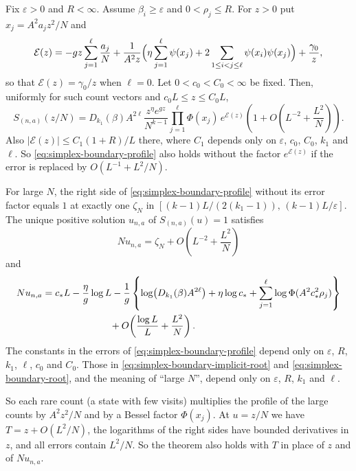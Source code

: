 \begin{theorem}
\label{thm:simplex-boundary-crossover}
Fix $\varepsilon>0$ and $R<\infty$. Assume $\beta_i\ge\varepsilon$ and
$0<\rho_j\le R$. For $z>0$ put $x_j=A^2a_jz^2/N$ and
\[
\mathcal E(z)=-gz\sum_{j=1}^\ell\frac{a_j}{N}
+\frac{1}{A^2z}\Bigl(\eta\sum_{j=1}^\ell\psi(x_j)
+2\sum_{1\le i<j\le\ell}\psi(x_i)\psi(x_j)\Bigr)+\frac{\gamma_0}{z},
\]
so that $\mathcal E(z)=\gamma_0/z$ when $\ell=0$. Let $0<c_0<C_0<\infty$ be
fixed. Then, uniformly for such count vectors and $c_0L\le z\le C_0L$,
\begin{equation}\label{eq:simplex-boundary-profile}
S_{(n,a)}(z/N)
=D_{k_1}(\beta)A^{2\ell}\frac{z^\eta e^{gz}}{N^{k-1}}
\prod_{j=1}^\ell\Phi(x_j)\,e^{\mathcal E(z)}
\left(1+O\!\left(L^{-2}+\frac{L^2}{N}\right)\right).
\end{equation}
Also $|\mathcal E(z)|\le C_1(1+R)/L$ there, where $C_1$ depends only on
$\varepsilon$, $c_0$, $C_0$, $k_1$ and $\ell$. So
\eqref{eq:simplex-boundary-profile} also holds without the factor
$e^{\mathcal E(z)}$ if the error is replaced by $O(L^{-1}+L^2/N)$.

For large $N$, the right side of \eqref{eq:simplex-boundary-profile}
without its error factor equals $1$ at exactly one $\zeta_N$ in
$[(k-1)L/(2(k_1-1)),\,(k-1)L/\varepsilon]$. The unique positive solution $u_{n,a}$ of
$S_{(n,a)}(u)=1$ satisfies
\begin{equation}\label{eq:simplex-boundary-implicit-root}
Nu_{n,a}=\zeta_N+O\!\left(L^{-2}+\frac{L^2}{N}\right)
\end{equation}
and
\begin{align}
Nu_{n,a}
={}&c_*L-\frac\eta g\log L
-\frac1g\left\{
\log\bigl(D_{k_1}(\beta)A^{2\ell}\bigr)+\eta\log c_*
+\sum_{j=1}^\ell\log\Phi(A^2c_*^2\rho_j)\right\}
\notag\\
&\hspace{20mm}+O\!\left(\frac{\log L}{L}+\frac{L^2}{N}\right).
\label{eq:simplex-boundary-root}
\end{align}
The constants in the errors of \eqref{eq:simplex-boundary-profile} depend
only on $\varepsilon$, $R$, $k_1$, $\ell$, $c_0$ and $C_0$. Those in
\eqref{eq:simplex-boundary-implicit-root} and
\eqref{eq:simplex-boundary-root}, and the meaning of ``large $N$'', depend
only on $\varepsilon$, $R$, $k_1$ and $\ell$.
\end{theorem}

So each rare count (a state with few visits) multiplies the profile of
the large counts by $A^2z^2/N$ and by a Bessel factor $\Phi(x_j)$. At $u=z/N$ we have $T=z+O(L^2/N)$, the
logarithms of the right sides have bounded derivatives in $z$, and all errors
contain $L^2/N$. So the theorem also holds with $T$ in place of $z$ and of
$Nu_{n,a}$.

